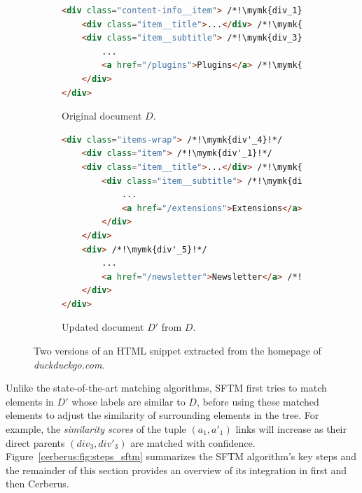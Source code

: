 \begin{figure}
    \centering
    \begin{subfigure}[b]{\linewidth}
        \centering
        \caption{Original document $D$.}
        \begin{lstlisting}[language=html, label={cerberus:fig:first_version}]
<div class="content-info__item"> /*!\mymk{div_1}!*/
    <div class="item__title">...</div> /*!\mymk{div_2}!*/
    <div class="item__subtitle"> /*!\mymk{div_3}!*/
        ... 
        <a href="/plugins">Plugins</a> /*!\mymk{~a_1~}!*/
    </div>
</div>
        \end{lstlisting}
    \end{subfigure}
    \hfill
    \begin{subfigure}[b]{\linewidth}
        \centering
        \caption{Updated document $D'$ from $D$.}
        \begin{lstlisting}[language=html, label={cerberus:fig:second_version}]
<div class="items-wrap"> /*!\mymk{div'_4}!*/
    <div class="item"> /*!\mymk{div'_1}!*/
    <div class="item__title">...</div> /*!\mymk{div'_2}!*/
        <div class="item__subtitle"> /*!\mymk{div'_3}!*/
            ... 
            <a href="/extensions">Extensions</a> /*!\mymk{~a'_1~}!*/
        </div>
    </div>
    <div> /*!\mymk{div'_5}!*/  
        ...
        <a href="/newsletter">Newsletter</a> /*!\mymk{~a'_2~}!*/
    </div>
</div>
        \end{lstlisting}
    \end{subfigure}
    \caption{Two versions of an HTML snippet extracted from the homepage of \emph{duckduckgo.com}.}
    \label{cerberus:fig:example_html}
\end{figure}

Unlike the state-of-the-art matching algorithms, SFTM first tries to match elements in $D'$ whose labels are similar to $D$, before using these matched elements to adjust the similarity of surrounding elements in the tree.
For example, the \emph{similarity scores} of the tuple $(a_1,a'_1)$ links will increase as their direct parents $(div_3,div'_3)$ are matched with confidence.
% 
Figure~\ref{cerberus:fig:steps_sftm} summarizes the SFTM algorithm's key steps and the remainder of this section provides an overview of its integration in \erratum{} first and then Cerberus.

